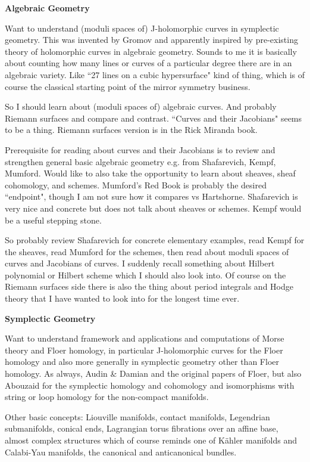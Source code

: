 \documentclass[hidelinks, 12pt]{article}
\theoremstyle{mydefstyle}
\theoremstyle{mythmstyle}
\begin{document}
\textbf{Algebraic Geometry}

Want to understand (moduli spaces of) J-holomorphic curves in symplectic geometry. This was invented by Gromov and apparently inspired by pre-existing theory of holomorphic curves in algebraic geometry. Sounds to me it is basically about counting how many lines or curves of a particular degree there are in an algebraic variety. Like ``27 lines on a cubic hypersurface" kind of thing, which is of course the classical starting point of the mirror symmetry business. 

So I should learn about (moduli spaces of) algebraic curves. And probably Riemann surfaces and compare and contrast. ``Curves and their Jacobians" seems to be a thing. Riemann surfaces version is in the Rick Miranda book. 

Prerequisite for reading about curves and their Jacobians is to review and strengthen general basic algebraic geometry e.g. from Shafarevich, Kempf, Mumford. Would like to also take the opportunity to learn about sheaves, sheaf cohomology, and schemes. Mumford's Red Book is probably the desired ``endpoint", though I am not sure how it compares vs Hartshorne. Shafarevich is very nice and concrete but does not talk about sheaves or schemes. Kempf would be a useful stepping stone. 

So probably review Shafarevich for concrete elementary examples, read Kempf for the sheaves, read Mumford for the schemes, then read about moduli spaces of curves and Jacobians of curves. I suddenly recall something about Hilbert polynomial or Hilbert scheme which I should also look into. Of course on the Riemann surfaces side there is also the thing about period integrals and Hodge theory that I have wanted to look into for the longest time ever. 

\textbf{Symplectic Geometry}

Want to understand framework and applications and computations of Morse theory and Floer homology, in particular J-holomorphic curves for the Floer homology and also more generally in symplectic geometry other than Floer homology. As always, Audin \& Damian and the original papers of Floer, but also Abouzaid for the symplectic homology and cohomology and isomorphisms with string or loop homology for the non-compact manifolds.

Other basic concepts: Liouville manifolds, contact manifolds, Legendrian submanifolds, conical ends, Lagrangian torus fibrations over an affine base, almost complex structures which of course reminds one of K{\"a}hler manifolds and Calabi-Yau manifolds, the canonical and anticanonical bundles. 
\end{document}
